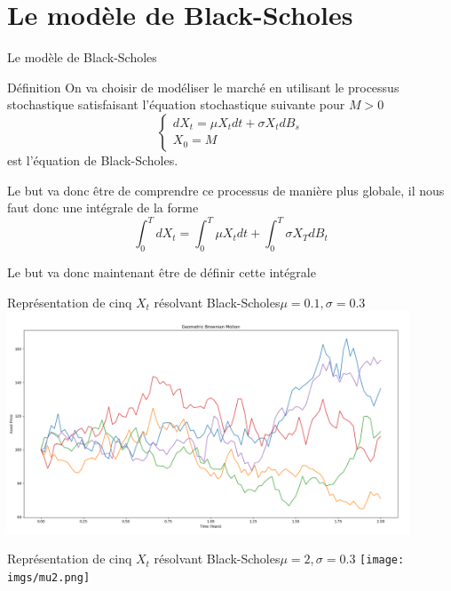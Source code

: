 \documentclass{beamer}
\newcommand{\1}{\mathmybb{1}}
\begin{document}
\section{Le modèle de Black-Scholes}
\begin{frame}{Le modèle de Black-Scholes}
  \begin{block}{Définition}
    On va choisir de modéliser le marché en utilisant le processus stochastique satisfaisant l'équation stochastique suivante pour $M > 0$
    \begin{equation}
      \begin{cases}
        dX_{t} = \mu X_{t} dt + \sigma X_{t} dB_{s} \\
        X_{0} = M
      \end{cases}
      \end{equation}
      est l'équation de Black-Scholes. \\
    \end{block}
    \pause
    \begin{alertblock}{}
    Le but va donc être de comprendre ce processus de manière plus globale, il nous faut donc une intégrale de la forme
    \[
      \int_0^{T} dX_{t} = \int_0^{T} \mu X_{t} dt + \int_{0}^{T} \sigma X_{T} dB_{t}
    \]
  \end{alertblock}
  \pause
  Le but va donc maintenant être de définir cette intégrale
\end{frame}
 \begin{frame}{Représentation de cinq $X_{t}$ résolvant Black-Scholes}{$\mu =0.1, \sigma =0.3$}
   \includegraphics[width=12cm]{imgs/bs5.png}
 \end{frame}
 \begin{frame}{Représentation de cinq $X_{t}$ résolvant Black-Scholes}{$\mu =2, \sigma =0.3$}
   \texttt{[image: imgs/mu2.png]}
 \end{frame}
\end{document}
